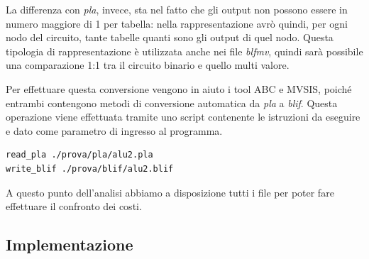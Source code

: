 \documentclass[]{book}
\begin{document}
La differenza con \emph{pla}, invece, sta nel fatto che gli output non possono essere in numero maggiore di 1 per tabella: nella rappresentazione avrò quindi, per ogni nodo del circuito, tante tabelle quanti sono gli output di quel nodo. Questa tipologia di rappresentazione è utilizzata anche nei file \emph{blfmv}, quindi sarà possibile una comparazione 1:1 tra il circuito binario e quello multi valore.

Per effettuare questa conversione vengono in aiuto i tool ABC e MVSIS, poiché entrambi contengono metodi di conversione automatica da \emph{pla} a \emph{blif}. Questa operazione viene effettuata tramite uno script contenente le istruzioni da eseguire e dato come parametro di ingresso al programma. \citep{kukimoto1996blif}

\begin{verbatim}
read_pla ./prova/pla/alu2.pla
write_blif ./prova/blif/alu2.blif
\end{verbatim}

A questo punto dell'analisi abbiamo a disposizione tutti i file per poter fare effettuare il confronto dei costi.

\newpage

\hypertarget{implementazione}{%
\subsection{Implementazione}\label{implementazione}}
\end{document}
